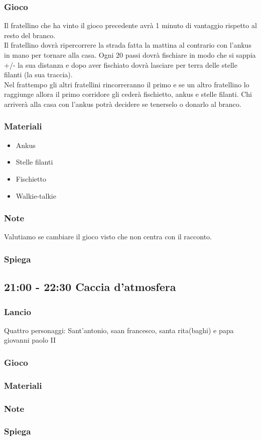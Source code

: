 \documentclass[../main.tex]{subfiles}
\begin{document}
       \subsubsection{Gioco}
       Il fratellino che ha vinto il gioco precedente avrà 1 minuto di vantaggio rispetto al resto del branco.\\
       Il fratellino dovrà ripercorrere la strada fatta la mattina al contrario con l'ankus in mano per tornare alla casa. Ogni 20 passi dovrà fischiare in modo che si sappia +/- la sua distanza e dopo aver fischiato dovrà lasciare per terra delle stelle filanti (la sua traccia).\\
       Nel frattempo gli altri fratellini rincorreranno il primo e se un altro fratellino lo raggiunge allora il primo corridore gli cederà fischietto, ankus e stelle filanti.
       Chi arriverà alla casa con l'ankus potrà decidere se tenerselo o donarlo al branco.
       
    \subsubsection{Materiali}
       \begin{itemize}
            \item Ankus
            \item Stelle filanti
            \item Fischietto
            \item Walkie-talkie
       \end{itemize}
       \subsubsection{Note}
       Valutiamo se cambiare il gioco visto che non centra con il racconto.
        \subsubsection{Spiega}
    
    \subsection{21:00 - 22:30 Caccia d'atmosfera}
        \subsubsection{Lancio}
        Quattro personaggi: Sant’antonio, saan francesco, santa rita(baghi) e papa giovanni paolo II
    
        \subsubsection{Gioco}

        \subsubsection{Materiali}
        \subsubsection{Note}
        \subsubsection{Spiega}
   
\end{document}
